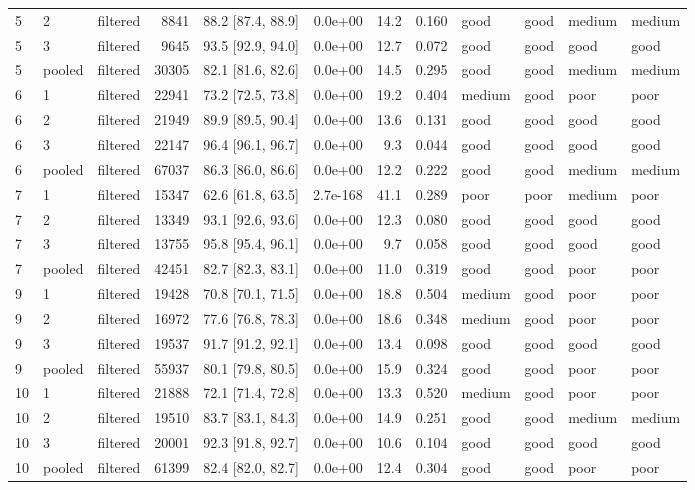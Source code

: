 \begin{longtable}{lllrrrrrllll}
5 & 2 & filtered & 8841 & 88.2 [87.4, 88.9] & 0.0e+00 & 14.2 & 0.160 & good & good & medium & medium \\
5 & 3 & filtered & 9645 & 93.5 [92.9, 94.0] & 0.0e+00 & 12.7 & 0.072 & good & good & good & good \\
5 & pooled & filtered & 30305 & 82.1 [81.6, 82.6] & 0.0e+00 & 14.5 & 0.295 & good & good & medium & medium \\
6 & 1 & filtered & 22941 & 73.2 [72.5, 73.8] & 0.0e+00 & 19.2 & 0.404 & medium & good & poor & poor \\
6 & 2 & filtered & 21949 & 89.9 [89.5, 90.4] & 0.0e+00 & 13.6 & 0.131 & good & good & good & good \\
6 & 3 & filtered & 22147 & 96.4 [96.1, 96.7] & 0.0e+00 & 9.3 & 0.044 & good & good & good & good \\
6 & pooled & filtered & 67037 & 86.3 [86.0, 86.6] & 0.0e+00 & 12.2 & 0.222 & good & good & medium & medium \\
7 & 1 & filtered & 15347 & 62.6 [61.8, 63.5] & 2.7e-168 & 41.1 & 0.289 & poor & poor & medium & poor \\
7 & 2 & filtered & 13349 & 93.1 [92.6, 93.6] & 0.0e+00 & 12.3 & 0.080 & good & good & good & good \\
7 & 3 & filtered & 13755 & 95.8 [95.4, 96.1] & 0.0e+00 & 9.7 & 0.058 & good & good & good & good \\
7 & pooled & filtered & 42451 & 82.7 [82.3, 83.1] & 0.0e+00 & 11.0 & 0.319 & good & good & poor & poor \\
9 & 1 & filtered & 19428 & 70.8 [70.1, 71.5] & 0.0e+00 & 18.8 & 0.504 & medium & good & poor & poor \\
9 & 2 & filtered & 16972 & 77.6 [76.8, 78.3] & 0.0e+00 & 18.6 & 0.348 & medium & good & poor & poor \\
9 & 3 & filtered & 19537 & 91.7 [91.2, 92.1] & 0.0e+00 & 13.4 & 0.098 & good & good & good & good \\
9 & pooled & filtered & 55937 & 80.1 [79.8, 80.5] & 0.0e+00 & 15.9 & 0.324 & good & good & poor & poor \\
10 & 1 & filtered & 21888 & 72.1 [71.4, 72.8] & 0.0e+00 & 13.3 & 0.520 & medium & good & poor & poor \\
10 & 2 & filtered & 19510 & 83.7 [83.1, 84.3] & 0.0e+00 & 14.9 & 0.251 & good & good & medium & medium \\
10 & 3 & filtered & 20001 & 92.3 [91.8, 92.7] & 0.0e+00 & 10.6 & 0.104 & good & good & good & good \\
10 & pooled & filtered & 61399 & 82.4 [82.0, 82.7] & 0.0e+00 & 12.4 & 0.304 & good & good & poor & poor \\

\end{longtable}
